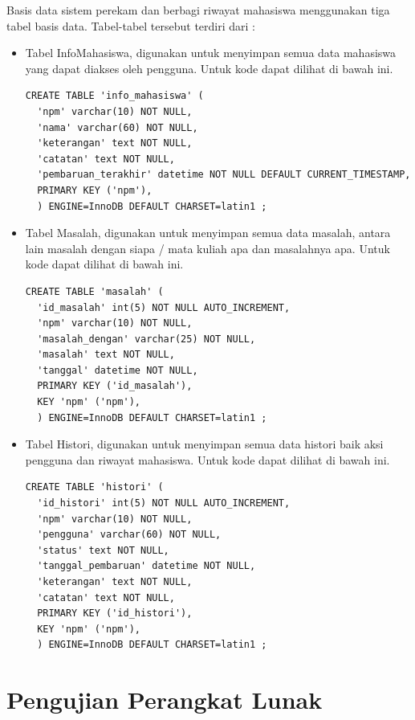 Basis data sistem perekam dan berbagi riwayat mahasiswa menggunakan tiga tabel basis data. Tabel-tabel tersebut terdiri dari :
\begin{itemize}
\item Tabel InfoMahasiswa, digunakan untuk menyimpan semua data mahasiswa yang dapat diakses oleh pengguna. Untuk kode dapat dilihat di bawah ini.

\begin{lstlisting}[basicstyle=\footnotesize]
  CREATE TABLE 'info_mahasiswa' (
  'npm' varchar(10) NOT NULL,
  'nama' varchar(60) NOT NULL,
  'keterangan' text NOT NULL,
  'catatan' text NOT NULL,
  'pembaruan_terakhir' datetime NOT NULL DEFAULT CURRENT_TIMESTAMP,
  PRIMARY KEY ('npm'),
  ) ENGINE=InnoDB DEFAULT CHARSET=latin1 ;
\end{lstlisting}

\item Tabel Masalah, digunakan untuk menyimpan semua data masalah, antara lain masalah dengan siapa / mata kuliah apa dan masalahnya apa. Untuk kode dapat dilihat di bawah ini.

\begin{lstlisting}[basicstyle=\footnotesize]
  CREATE TABLE 'masalah' (
  'id_masalah' int(5) NOT NULL AUTO_INCREMENT,
  'npm' varchar(10) NOT NULL,
  'masalah_dengan' varchar(25) NOT NULL,
  'masalah' text NOT NULL,
  'tanggal' datetime NOT NULL,
  PRIMARY KEY ('id_masalah'),
  KEY 'npm' ('npm'),
  ) ENGINE=InnoDB DEFAULT CHARSET=latin1 ;
\end{lstlisting}

\item Tabel Histori, digunakan untuk menyimpan semua data histori baik aksi pengguna dan riwayat mahasiswa. Untuk kode dapat dilihat di bawah ini.

\begin{lstlisting}[basicstyle=\footnotesize]
  CREATE TABLE 'histori' (
  'id_histori' int(5) NOT NULL AUTO_INCREMENT,
  'npm' varchar(10) NOT NULL,
  'pengguna' varchar(60) NOT NULL,
  'status' text NOT NULL,
  'tanggal_pembaruan' datetime NOT NULL,
  'keterangan' text NOT NULL,
  'catatan' text NOT NULL,
  PRIMARY KEY ('id_histori'),
  KEY 'npm' ('npm'),
  ) ENGINE=InnoDB DEFAULT CHARSET=latin1 ;
\end{lstlisting}
\end{itemize}

\section{Pengujian Perangkat Lunak}
\label{sec:pengujianperangkatlunak}

